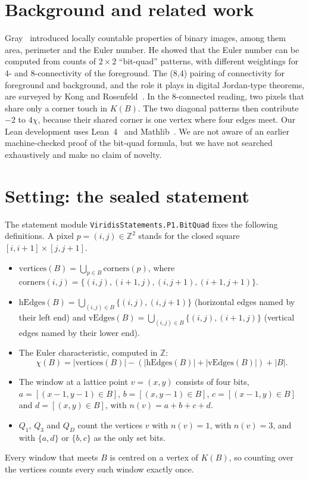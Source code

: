 \documentclass[11pt]{article}
\theoremstyle{definition}
\theoremstyle{remark}
\begin{document}
\section{Background and related work}

Gray~\cite{Gray1971} introduced locally countable properties of binary images,
among them area, perimeter and the Euler number. He showed that the Euler number
can be computed from counts of $2\times2$ ``bit-quad'' patterns, with different
weightings for 4- and 8-connectivity of the foreground. The (8,4) pairing of
connectivity for foreground and background, and the role it plays in digital
Jordan-type theorems, are surveyed by Kong and Rosenfeld~\cite{KongRosenfeld1989}.
In the 8-connected reading, two pixels that share only a corner touch in $K(B)$.
The two diagonal patterns then contribute $-2$ to $4\chi$, because their
shared corner is one vertex where four edges meet. Our Lean development uses
Lean~4~\cite{Lean4} and Mathlib~\cite{Mathlib2020}. We are not aware of an
earlier machine-checked proof of the bit-quad formula, but we have not searched
exhaustively and make no claim of novelty.

\section{Setting: the sealed statement}

The statement module \texttt{ViridisStatements.P1.BitQuad} fixes the following
definitions. A pixel $p=(i,j)\in\mathbb{Z}^2$ stands for the closed square
$[i,i+1]\times[j,j+1]$.
\begin{itemize}
\item $\mathrm{vertices}(B)=\bigcup_{p\in B}\mathrm{corners}(p)$, where
  $\mathrm{corners}(i,j)=\{(i,j),(i+1,j),(i,j+1),(i+1,j+1)\}$.
\item $\mathrm{hEdges}(B)=\bigcup_{(i,j)\in B}\{(i,j),(i,j+1)\}$ (horizontal
  edges named by their left end) and
  $\mathrm{vEdges}(B)=\bigcup_{(i,j)\in B}\{(i,j),(i+1,j)\}$ (vertical edges named
  by their lower end).
\item The Euler characteristic, computed in $\mathbb{Z}$:
  \[\chi(B) = |\mathrm{vertices}(B)| - (|\mathrm{hEdges}(B)|+|\mathrm{vEdges}(B)|) + |B|.\]
\item The window at a lattice point $v=(x,y)$ consists of four bits,
  $a=[(x-1,y-1)\in B]$, $b=[(x,y-1)\in B]$, $c=[(x-1,y)\in B]$ and
  $d=[(x,y)\in B]$, with $n(v)=a+b+c+d$.
\item $Q_1$, $Q_3$ and $Q_D$ count the vertices $v$ with $n(v)=1$, with
  $n(v)=3$, and with $\{a,d\}$ or $\{b,c\}$ as the only set bits.
\end{itemize}
Every window that meets $B$ is centred on a vertex of $K(B)$, so counting over
the vertices counts every such window exactly once.
\end{document}
